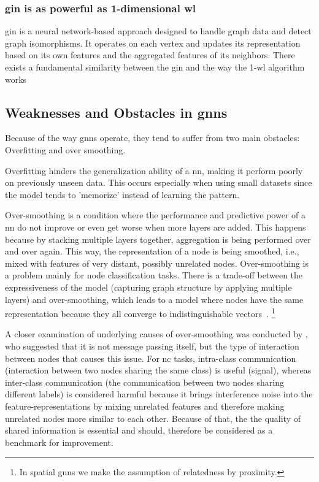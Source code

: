\subsubsection{\acl*{gin} is as powerful as 1-dimensional \acs*{wl}}
\Ac{gin} is a neural network-based approach designed to handle graph data and detect graph isomorphisms. It operates on each vertex and updates its representation based on its own features and the aggregated features of its neighbors. There exists a fundamental similarity between the \ac{gin} and the way the 1-\ac{wl} algorithm works
\subsection{Weaknesses and Obstacles in \acsp*{gnn}}
\label{sec:related:pred:typical}
Because of the way \acp{gnn} operate, they tend to suffer from two main obstacles:
Overfitting and over smoothing.

Overfitting hinders the generalization ability of a \acf{nn}, making it perform poorly on previously unseen data.
This occurs especially when using small datasets since the model tends to 'memorize' instead of learning the pattern.

Over-smoothing is a condition where the performance and predictive power of a \ac{nn} do not improve or even get worse when more layers are added.
This happens because by stacking multiple layers together, aggregation is being performed over and over again.
This way, the representation of a node is being smoothed, i.e., mixed with features of very distant, possibly unrelated nodes.
Over-smoothing is a problem mainly for node classification tasks. There is a trade-off between the expressiveness of the model (capturing graph structure by applying multiple layers) and over-smoothing, which leads to a model where nodes have the same representation because they all converge to indistinguishable vectors~\cite{Zhou2020,Hasanzadeh2020}.%
\footnote{In spatial \acp{gnn} we make the assumption of relatedness by proximity.}

A closer examination of underlying causes of over-smoothing was conducted by \citet{Chen2020}, who suggested that it is not message passing itself, but the type of interaction between nodes that causes this issue.
For \acf{nc} tasks, intra-class communication (interaction between two nodes sharing the same class) is useful (signal), whereas inter-class communication (the communication between two nodes sharing different labels) is considered harmful because it brings interference noise into the feature-representations by mixing unrelated features and therefore making unrelated nodes more similar to each other.
Because of that, the the quality of shared information is essential and should, therefore be considered as a benchmark for improvement.


